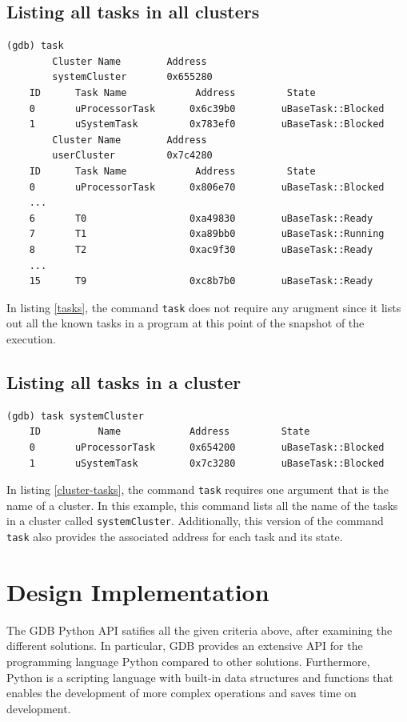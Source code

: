 \subsection{Listing all tasks in all clusters}
\begin{lstlisting}[caption={\text{tasks} command}, label={tasks},
basicstyle=\small]
(gdb) task
        Cluster Name        Address
        systemCluster       0x655280
    ID      Task Name            Address         State
    0       uProcessorTask      0x6c39b0        uBaseTask::Blocked
    1       uSystemTask         0x783ef0        uBaseTask::Blocked
        Cluster Name        Address
        userCluster         0x7c4280
    ID      Task Name            Address         State
    0       uProcessorTask      0x806e70        uBaseTask::Blocked
    ...
    6       T0                  0xa49830        uBaseTask::Ready
    7       T1                  0xa89bb0        uBaseTask::Running
    8       T2                  0xac9f30        uBaseTask::Ready
    ...
    15      T9                  0xc8b7b0        uBaseTask::Ready
\end{lstlisting}
In listing \ref{tasks}, the command \verb|task| does not require any
arugment since it lists out all the known tasks in a \uCPPS program at this
point of the snapshot of the execution.

\subsection{Listing all tasks in a cluster}
\begin{lstlisting}[caption={\text{cluster\_tasks} command}, label={cluster-tasks}]
(gdb) task systemCluster
    ID          Name            Address         State
    0       uProcessorTask      0x654200        uBaseTask::Blocked
    1       uSystemTask         0x7c3280        uBaseTask::Blocked
\end{lstlisting}
In listing \ref{cluster-tasks}, the command \verb|task| requires one argument
that is the name of a cluster. In this example, this command lists
all the name of the tasks in a cluster called \verb|systemCluster|.
Additionally, this version of the command \verb|task| also provides the associated address
for each task and its state.

\section{Design Implementation}
The GDB Python API satifies all the given criteria above, after examining the different solutions. In particular, GDB provides an extensive API for
the programming language Python compared to other solutions. Furthermore, Python is a scripting language with built-in
data structures and functions that enables the development of more complex
operations and saves time on development.

